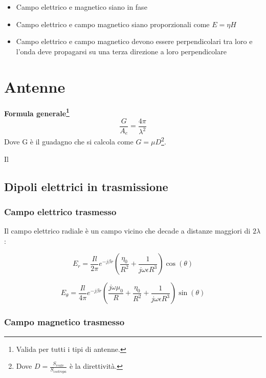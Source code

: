 \documentclass[10pt,a4paper]{report}
\begin{document}
	\begin{itemize}

	\item Campo elettrico e magnetico siano in fase 

	\item Campo elettrico e campo magnetico siano proporzionali come $E=\eta H$

	\item Campo elettrico e campo magnetico devono essere perpendicolari tra loro e l'onda deve propagarsi su una terza direzione a loro perpendicolare

	\end{itemize}



\chapter{Antenne}
		\textbf{Formula generale\footnote{Valida per tutti i tipi di antenne.}}
		\begin{equation}
		\frac{G}{A_e}=\frac{4\pi}{\lambda^2}
		\end{equation}
	    Dove G è il guadagno che si calcola come $G=\mu D$\footnote{Dove $D=\frac{S_{reale}}{S_{isotropa}}$ è la direttività.}.

	    Il
	 \section{Dipoli elettrici in trasmissione}

		\subsection{Campo elettrico trasmesso}

		Il campo elettrico radiale è un campo vicino che decade a distanze maggiori di $2\lambda$:
		
		\begin{equation}
		E_r=\frac{I{l}}{2\pi}e^{-j\beta r}(\frac{ \eta_0}{R^2}+\frac{1}{j \omega \epsilon R^3})\cos(\theta)
		\end{equation}
		
		\[
		 E_{\theta} = \frac {Il} {4\pi} e^{-j\beta r} ( \frac {j\omega \mu_0} {R} + \frac {\eta_0} {R^2} + \frac {1}  {j \omega \epsilon R^3} ) \sin(\theta)
		\]

		\subsection{Campo magnetico trasmesso}
\end{document}
